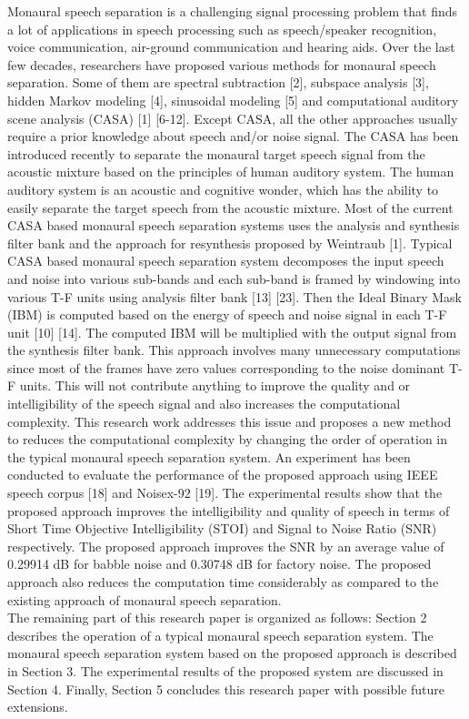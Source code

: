 \documentclass[a4paper]{article}
\begin{document}
Monaural speech separation is a challenging signal processing problem that finds a lot of applications in speech processing such as speech/speaker recognition, voice communication, air-ground communication and hearing aids. Over the last few decades, researchers have proposed various methods for monaural speech separation. Some of them are spectral subtraction [2], subspace analysis [3], hidden Markov modeling [4], sinusoidal modeling [5] and computational auditory scene analysis (CASA) [1] [6-12]. Except CASA, all the other approaches usually require a prior knowledge about speech and/or noise signal. The CASA has been introduced recently to separate the monaural target speech signal from the acoustic mixture based on the principles of human auditory system. The human auditory system is an acoustic and cognitive wonder, which has the ability to easily separate the target speech from the acoustic mixture. Most of the current CASA based monaural speech separation systems uses the analysis and synthesis filter bank and the approach for resynthesis proposed by Weintraub [1]. Typical CASA based monaural speech separation system decomposes the input speech and noise into various sub-bands and each sub-band is framed by windowing into various T-F units using analysis filter bank [13] [23]. Then the Ideal Binary Mask (IBM) is computed based on the energy of speech and noise signal in each T-F unit [10] [14]. The computed IBM will be multiplied with the output signal from the synthesis filter bank. This approach involves many unnecessary computations since most of the frames have zero values corresponding to the noise dominant T-F units. This will not contribute anything to improve the quality and or intelligibility of the speech signal and also increases the computational complexity. This research work addresses this issue and proposes a new method to reduces the computational complexity by changing the order of operation in the typical monaural speech separation system. An experiment has been conducted to evaluate the performance of the proposed approach using IEEE speech corpus [18] and Noisex-92 [19]. The experimental results show that the proposed approach improves the intelligibility and quality of speech in terms of Short Time Objective Intelligibility (STOI) and Signal to Noise Ratio (SNR) respectively. The proposed approach improves the SNR by an average value of 0.29914 dB for babble noise and 0.30748 dB for factory noise. The proposed approach also reduces the computation time considerably as compared to the existing approach of monaural speech separation.
\\ The remaining part of this research paper is organized as follows: Section 2 describes the operation of a typical monaural speech separation system. The monaural speech separation system based on the proposed approach is described in Section 3. The experimental results of the proposed system are discussed in Section 4. Finally, Section 5 concludes this research paper with possible future extensions.
\end{document}
